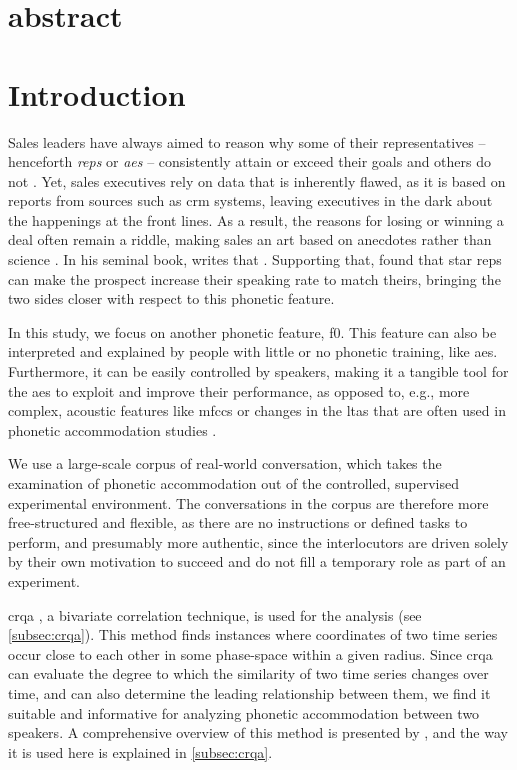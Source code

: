 \section{abstract}

\section{Introduction}
\label{sec:introduction}

Sales leaders have always aimed to reason why some of their representatives -- henceforth \emph{reps} or \emph{\acp{ae}} -- consistently attain or exceed their goals and others do not \citep{Kovac2017its}.
Yet, sales executives rely on data that is inherently flawed, as it is based on reports from sources such as \ac{crm} systems, leaving executives in the dark about the happenings at the front lines.
As a result, the reasons for losing or winning a deal often remain a riddle, making sales an art based on anecdotes rather than science \citep{Yohn2016best, Martin2017six}.
In his seminal book, \citet{Gladwell2006tipping} writes that .
Supporting that, \citet{Orlob2018nine} found that star reps can make the prospect increase their speaking rate to match theirs, bringing the two sides closer with respect to this phonetic feature.

In this study, we focus on another phonetic feature, \ac{f0}.
This feature can also be interpreted and explained by people with little or no phonetic training, like \acp{ae}.
Furthermore, it can be easily controlled by speakers, making it a tangible tool for the \acp{ae} to exploit and improve their performance, as opposed to, e.g., more complex, acoustic features like \acp{mfcc} or changes in the \ac{ltas} that are often used in phonetic accommodation studies \citep{Levitan2011measuring,Borrie2019syncing}.

We use a large-scale corpus of real-world conversation, which takes the examination of phonetic accommodation out of the controlled, supervised experimental environment.
The conversations in the corpus are therefore more free-structured and flexible, as there are no instructions or defined tasks to perform, and presumably more authentic, since the interlocutors are driven solely by their own motivation to succeed and do not fill a temporary role as part of an experiment.

\Ac{crqa} \citep{Zbilut1998detecting}, a bivariate correlation technique, is used for the analysis (see \cref{subsec:crqa}).
This method finds instances where coordinates of two time series occur close to each other in some phase-space within a given radius.
Since \ac{crqa} can evaluate the degree to which the similarity of two time series changes over time, and can also determine the leading relationship between them, we find it suitable and informative for analyzing phonetic accommodation between two speakers.
A comprehensive overview of this method is presented by \citet{Wallot2018analyzing}, and the way it is used here is explained in \cref{subsec:crqa}.

